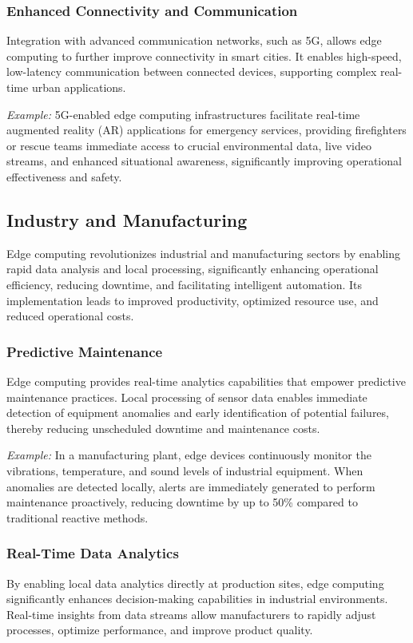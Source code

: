 \documentclass[runningheads]{llncs}
\begin{document}
\subsubsection{Enhanced Connectivity and Communication}
Integration with advanced communication networks, such as 5G, allows edge computing to further improve connectivity in smart cities. It enables high-speed, low-latency communication between connected devices, supporting complex real-time urban applications.

\textit{Example:} 5G-enabled edge computing infrastructures facilitate real-time augmented reality (AR) applications for emergency services, providing firefighters or rescue teams immediate access to crucial environmental data, live video streams, and enhanced situational awareness, significantly improving operational effectiveness and safety.


\subsection{Industry and Manufacturing}

Edge computing revolutionizes industrial and manufacturing sectors by enabling rapid data analysis and local processing, significantly enhancing operational efficiency, reducing downtime, and facilitating intelligent automation. Its implementation leads to improved productivity, optimized resource use, and reduced operational costs.

\subsubsection{Predictive Maintenance}
Edge computing provides real-time analytics capabilities that empower predictive maintenance practices. Local processing of sensor data enables immediate detection of equipment anomalies and early identification of potential failures, thereby reducing unscheduled downtime and maintenance costs.

\textit{Example:} In a manufacturing plant, edge devices continuously monitor the vibrations, temperature, and sound levels of industrial equipment. When anomalies are detected locally, alerts are immediately generated to perform maintenance proactively, reducing downtime by up to 50\% compared to traditional reactive methods.

\subsubsection{Real-Time Data Analytics}
By enabling local data analytics directly at production sites, edge computing significantly enhances decision-making capabilities in industrial environments. Real-time insights from data streams allow manufacturers to rapidly adjust processes, optimize performance, and improve product quality.
\end{document}
